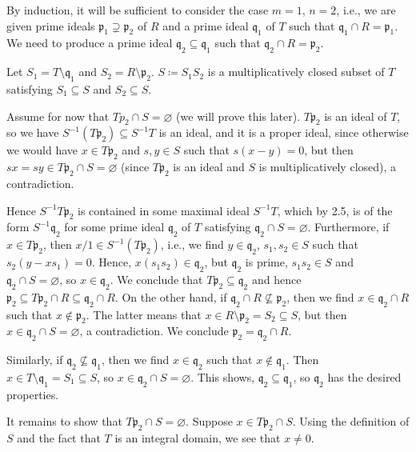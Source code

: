 By induction, it will be sufficient to consider the case $m = 1$, $n = 2$, i.e.,
we are given prime ideals $\mathfrak{p}_1 \supsetneq \mathfrak{p}_2$ of $R$ and
a prime ideal $\mathfrak{q}_1$ of $T$ such that $\mathfrak{q}_1\cap R = \mathfrak{p}_1$.
We need to produce a prime ideal $\mathfrak{q}_2 \subseteq \mathfrak{q}_1$ such that
$\mathfrak{q}_2\cap R = \mathfrak{p}_2$.

Let $S_1 = T\setminus \mathfrak{q}_1$ and $S_2 = R\setminus \mathfrak{p}_2$.
$S\coloneqq S_1S_2$ is a multiplicatively closed subset of $T$ satisfying
$S_1 \subseteq S$ and $S_2 \subseteq S$.

Assume for now that $Tp_2\cap S = \varnothing$ (we will prove this later).
$T \mathfrak{p}_2$ is an ideal of $T$, so we have $S^{-1}(T \mathfrak{p}_2) \subseteq S^{-1} T$
is an ideal, and it is a proper ideal, since otherwise we would have
$x \in T \mathfrak{p}_2$ and $s, y \in S$ such that $s(x-y) = 0$, but then
$sx = sy \in T \mathfrak{p}_2 \cap S = \varnothing$ (since $T \mathfrak{p}_2$ is
an ideal and $S$ is multiplicatively closed), a contradiction.

Hence $S^{-1} T \mathfrak{p}_2$ is contained in some maximal ideal $S^{-1}T$, which
by 2.5, is of the form $S^{-1} \mathfrak{q}_2$ for some prime ideal $\mathfrak{q}_2$
of $T$ satisfying $\mathfrak{q}_2\cap S = \varnothing$. Furthermore, if
$x \in T \mathfrak{p}_2$, then $x/1 \in S^{-1}(T \mathfrak{p}_2)$, i.e., we find
$y \in \mathfrak{q}_2$, $s_1, s_2 \in S$ such that $s_2(y - xs_1) = 0$. Hence,
$x(s_1s_2) \in \mathfrak{q}_2$, but $\mathfrak{q}_2$ is prime, $s_1s_2 \in S$ and
$\mathfrak{q}_2\cap S = \varnothing$, so $x \in \mathfrak{q}_2$. We conclude that
$T \mathfrak{p}_2 \subseteq \mathfrak{q}_2$ and hence
$\mathfrak{p}_2 \subseteq T \mathfrak{p}_2 \cap R \subseteq \mathfrak{q}_2 \cap R$.
On the other hand, if $\mathfrak{q}_2 \cap R \nsubseteq \mathfrak{p}_2$, then
we find $x \in \mathfrak{q}_2\cap R$ such that $x\notin \mathfrak{p}_2$. The
latter means that $x \in R\setminus \mathfrak{p}_2 = S_2 \subseteq S$, but then
$x \in \mathfrak{q}_2 \cap S = \varnothing$, a contradiction. We conclude
$\mathfrak{p}_2 = \mathfrak{q}_2\cap R$.

Similarly, if $\mathfrak{q_2} \nsubseteq \mathfrak{q}_1$, then we find
$x \in \mathfrak{q}_2$ such that $x\notin \mathfrak{q}_1$. Then
$x \in T\setminus \mathfrak{q}_1 = S_1 \subseteq S$, so $x \in \mathfrak{q}_2 \cap S = \varnothing$.
This shows, $\mathfrak{q}_2 \subseteq \mathfrak{q}_1$, so $\mathfrak{q}_2$ has
the desired properties.

It remains to show that $T \mathfrak{p}_2 \cap S = \varnothing$. Suppose
$x \in T \mathfrak{p}_2 \cap S$. Using the definition of $S$ and the fact that
$T$ is an integral domain, we see that $x\neq 0$.
